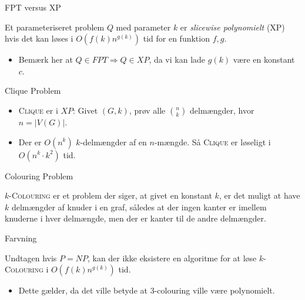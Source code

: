 \begin{frame}{FPT versus XP}
    \begin{definition}
        Et parameteriseret problem $Q$ med parameter $k$ er \textit{slicewise polynomielt} (XP) hvis det kan løses i $O(f(k) n^{g(k)})$ tid for en funktion $f,g$.
    \end{definition}
    \begin{itemize}
        \item Bemærk her at $Q \in FPT \Rightarrow Q \in XP$, da vi kan lade $g(k)$ være en konstant $c$.
    \end{itemize}
\end{frame}

\begin{frame}{Clique Problem}
    \begin{itemize}
        \item \textsc{Clique} er i $XP$: Givet $(G,k)$, prøv alle $\binom{n}{k}$ delmængder, hvor $n = |V(G)|$.
        \item Der er $O(n^{k})$ $k$-delmængder af en $n$-mængde. Så \textsc{Clique} er løseligt i $O(n^{k} \cdot k^{2})$ tid.
    \end{itemize}
\end{frame}

\begin{frame}{Colouring Problem}
    \begin{definition}
        \textsc{$k$-Colouring} er et problem der siger, at givet en konstant $k$, er det muligt at have $k$ delmængder af knuder i en graf, således at der ingen kanter er imellem knuderne i hver delmængde, men der er kanter til de andre delmængder.
    \end{definition}
\end{frame}

\begin{frame}{Farvning}
    \begin{lemma}
        Undtagen hvis $P = NP$, kan der ikke eksistere en algoritme for at løse \textsc{$k$-Colouring} i $O(f(k)n^{g(k)})$ tid.
    \end{lemma}
    \begin{itemize}
        \item Dette gælder, da det ville betyde at $3$-colouring ville være polynomielt.
    \end{itemize}
\end{frame}


